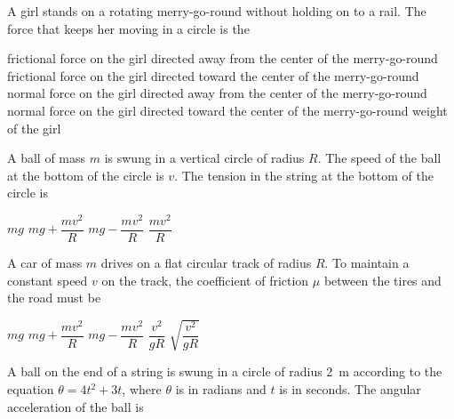 \documentclass{../../oss-apphys-exam}
\begin{document}
\genheader



\raggedcolumns
\begin{multicols*}{2}
  \begin{questions}
    \question A girl stands on a rotating merry-go-round without holding on to
    a rail. The force that keeps her moving in a circle is the
    \begin{choices}
      \choice frictional force on the girl directed away from the center of the
      merry-go-round
      \choice frictional force on the girl directed toward the center of the
      merry-go-round
      \choice normal force on the girl directed away from the center of the
      merry-go-round
      \choice normal force on the girl directed toward the center of the
      merry-go-round
      \choice weight of the girl
    \end{choices}
    
    \question A ball of mass $m$ is swung in a vertical circle of radius $R$.
    The speed of the ball at the bottom of the circle is $v$. The tension
    in the string at the bottom of the circle is
    \begin{choices}
      \choice $mg$
      \choice $mg+\dfrac{mv^2}R$
      \choice $mg-\dfrac{mv^2}R$
      \choice $\dfrac{mv^2}R$
    \end{choices}
    
    \question A car of mass $m$ drives on a flat circular track of radius $R$.
    To maintain a constant speed $v$ on the track, the coefficient of
    friction $\mu$ between the tires and the road must be
    \begin{choices}
      \choice $mg$
      \choice $mg+\dfrac{mv^2}R$
      \choice $mg-\dfrac{mv^2}R$
      \choice $\dfrac{v^2}{gR}$
      \choice $\sqrt{\dfrac{v^2}{gR}}$
    \end{choices}
    \columnbreak
    

    \question A ball on the end of a string is swung in a circle of radius
    \SI{2}{\metre} according to the equation $\theta = 4t^2+3t$, where $\theta$
    is in radians and $t$ is in seconds. The angular acceleration of the ball
    is
    \label{rad1}
    

\end{questions}
\end{multicols*}
\end{document}

